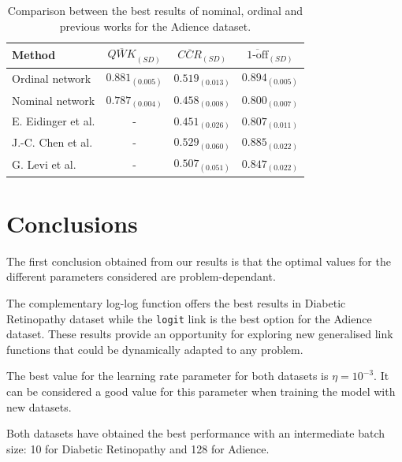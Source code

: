\documentclass[journal]{IEEEtran}
\begin{document}
	\begin{table}[!t]
		\caption{Comparison between the best results of nominal, ordinal and previous works for the Adience dataset.}
		\label{table:ComparisonAdience}
		\scriptsize
		\centering
		\def\arraystretch{1.3}
		\begin{tabular}{lccc}
			\hline
			\hline
			Method                                    & $\overline{QWK}_{(SD)}$ & $\overline{CCR}_{(SD)}$ & $\overline{\text{1-off}}_{(SD)}$ \\ \hline
			Ordinal network                           &    $0.881_{(0.005)}$    &    $0.519_{(0.013)}$    &        $0.894_{(0.005)}$         \\
			Nominal network                           &    $0.787_{(0.004)}$    &    $0.458_{(0.008)}$    &        $0.800_{(0.007)}$         \\
			E. Eidinger et al. \cite{eidinger2014age} &            -            &    $0.451_{(0.026)}$    &        $0.807_{(0.011)}$         \\
			J.-C. Chen et al. \cite{chen2016cascaded} &            -            &    $0.529_{(0.060)}$    &        $0.885_{(0.022)}$         \\
			G. Levi et al. \cite{levi2015age}         &            -            &    $0.507_{(0.051)}$    &        $0.847_{(0.022)}$		 \\
			\hline
			\hline
		\end{tabular}
	\end{table}
	
	\section{Conclusions}
	\label{sect:conclusions}
	The first conclusion obtained from our results is that the optimal values for the different parameters considered are problem-dependant. 
	
	The complementary log-log function offers the best results in Diabetic Retinopathy dataset while the \texttt{logit} link is the best option for the Adience dataset. These results provide an opportunity for exploring new generalised link functions that could be dynamically adapted to any problem.
	
	The best value for the learning rate parameter for both datasets is $\eta = 10^{-3}$. It can be considered a good value for this parameter when training the model with new datasets.
	
	Both datasets have obtained the best performance with an intermediate batch size: 10 for Diabetic Retinopathy and 128 for Adience.
	
\end{document}
